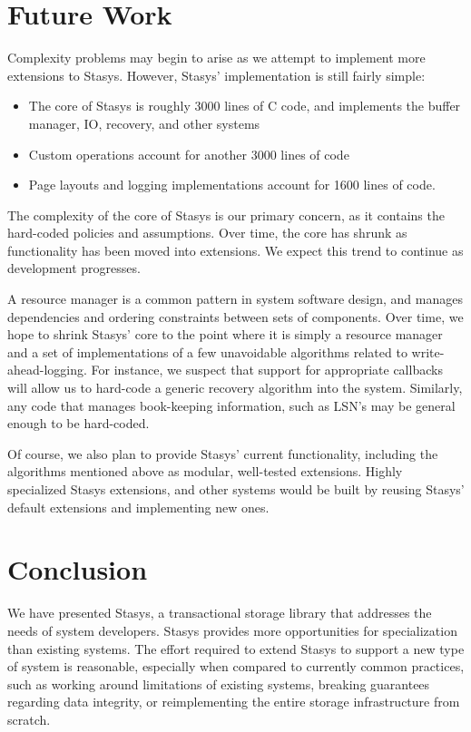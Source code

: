 \documentclass[letterpaper,twocolumn,10pt]{article}
\newcommand{\yad}{Stasys\xspace}
\newcommand{\yads}{Stasys'\xspace}
\begin{document}
\section{Future Work}

Complexity problems may begin to arise as we attempt to implement more
extensions to \yad.  However, \yads implementation is still fairly simple:

\begin{itemize}
\item The core of \yad is roughly 3000 lines
of C code, and implements the buffer manager, IO, recovery, and other
systems
\item Custom operations account for another 3000 lines of code
\item Page layouts and logging implementations account for 1600 lines of code.
\end{itemize}

The complexity of the core of \yad is our primary concern, as it
contains the hard-coded policies and assumptions.  Over time, the core has
shrunk as functionality has been moved into extensions.  We expect
this trend to continue as development progresses.  

A resource manager
is a common pattern in system software design, and manages
dependencies and ordering constraints between sets of components.
Over time, we hope to shrink \yads core to the point where it is
simply a resource manager and a set of implementations of a few unavoidable
algorithms related to write-ahead-logging.  For instance, 
we suspect that support for appropriate callbacks will 
allow us to hard-code a generic recovery algorithm into the 
system.  Similarly, any code that manages book-keeping information, such as 
LSN's may be general enough to be hard-coded.  

Of course, we also plan to provide \yads current functionality, including the algorithms
mentioned above as modular, well-tested extensions.
Highly specialized \yad extensions, and other systems would be built
by reusing \yads default extensions and implementing new ones.


\section{Conclusion}

We have presented \yad, a transactional storage library that addresses
the needs of system developers.  \yad provides more opportunities for
specialization than existing systems.  The effort required to extend
\yad to support a new type of system is reasonable, especially when
compared to currently common practices, such as working around
limitations of existing systems, breaking guarantees regarding data
integrity, or reimplementing the entire storage infrastructure from
scratch.
\end{document}
